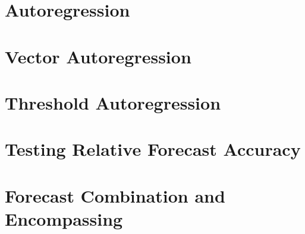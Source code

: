 \documentclass{tufte-book}
\begin{document}
	
	\chapter{Autoregression}
	\label{c6}
	
	
	\chapter{Vector Autoregression}
	\label{c7}
	
	
	\chapter{Threshold Autoregression}
	\label{c8}
	
	
	\chapter{Testing Relative Forecast Accuracy}
	\label{c9}
	
	
	\chapter{Forecast Combination and Encompassing}
	\label{c10}
	
	
	
	
	\backmatter
	
	
	
	
	
	\printindex
\end{document}
